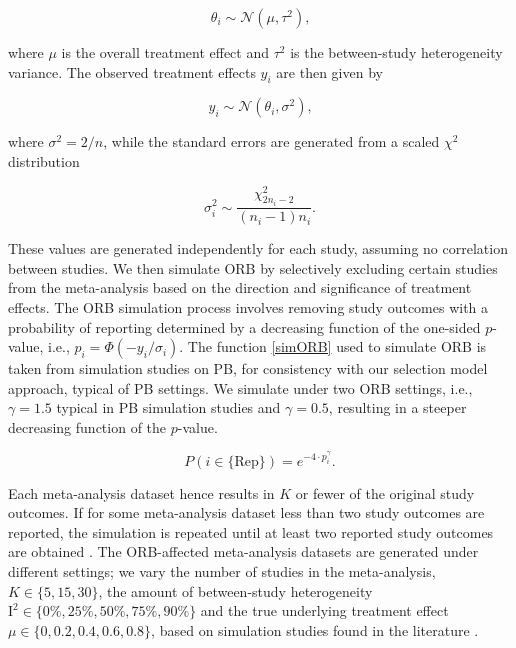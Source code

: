 \documentclass[twocolumn]{article}\usepackage[]{graphicx}\usepackage[]{xcolor}
\begin{document}
\begin{equation*}\label{eq:random.eff2}
\theta_i \sim \mathcal{N}(\mu, \tau^2) \text{,}
\end{equation*}

where $\mu$ is the overall treatment effect and $\tau^2$ is the between-study heterogeneity variance. The observed treatment effects $y_i$ are then given by 

\begin{equation*}\label{eq:random.eff1}
y_i \sim \mathcal{N}(\theta_i, \sigma^2) \text{,}
\end{equation*}

where $\sigma^2= 2/n$, while the standard errors are generated from a scaled $\chi^2$ distribution

\begin{equation*}
\label{sigma.sq.sim}
\sigma_i^2 \sim \frac{\chi^2_{2n_i - 2}}{(n_i -1)n_i} \text{.}
\end{equation*}

These values are generated independently for each study, assuming no correlation between studies. We then simulate ORB by selectively excluding certain studies from the meta-analysis based on the direction and significance of treatment effects. The ORB simulation process involves removing study outcomes with a probability of reporting determined by a decreasing function of the one-sided $p$-value, i.e., $p_i = \Phi(- y_i / \sigma_i)$. The function \eqref{simORB} used to simulate ORB is taken from simulation studies on PB, for consistency with our selection model approach, typical of PB settings. We simulate under two ORB settings, i.e., $\gamma=1.5$ typical in PB simulation studies \citep{selection2, Begg, BeggUse1, selectionCont} and $\gamma=0.5$, resulting in a steeper decreasing function of the $p$-value. 

\begin{equation}
P( i \in \{\text{Rep}\})= e^{-4 \cdot p_i^{\gamma}} \text{.}
\label{simORB}
\end{equation}

Each meta-analysis dataset hence results in $K$ or fewer of the original study outcomes. If for some meta-analysis dataset less than two study outcomes are reported, the simulation is repeated until at least two reported study outcomes are obtained \citep{selection2, Begg, BeggUse1, FernandezSim}. The ORB-affected meta-analysis datasets are generated under different settings; we vary the number of studies in the meta-analysis, $K \in \{5, 15, 30 \}$, the amount of between-study heterogeneity $\text{I}^2 \in \{0 \%, 25 \%, 50 \%, 75 \%, 90 \% \}$ and the true underlying treatment effect $\mu \in \{0, 0.2, 0.4, 0.6, 0.8 \}$, based on simulation studies found in the literature \citep{MorenoSim, IntHout2014, FernandezSim}.
\end{document}

